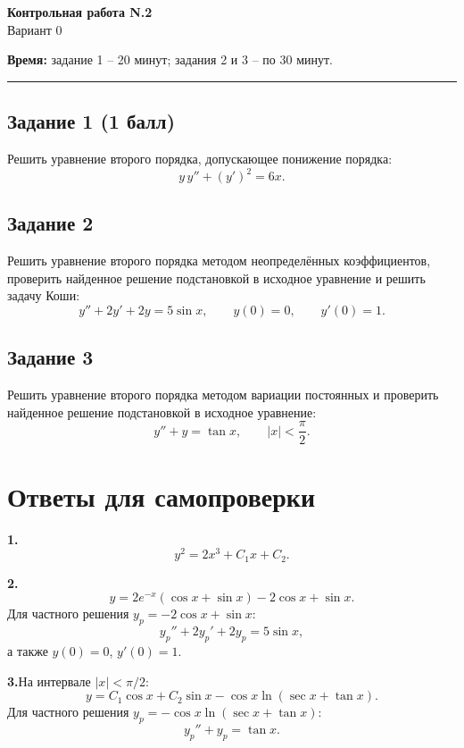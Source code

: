\documentclass[12pt,a4paper]{article}
\begin{document}
\begin{center}
{\Large \textbf{Контрольная работа N.2}}\\[4pt]
Вариант 0
\end{center}

\textbf{Время:} задание 1 -- 20 минут; задания 2 и 3 -- по 30 минут.

\hrule

\subsection*{Задание 1 (1 балл)}
Решить уравнение второго порядка, допускающее понижение порядка:
\[
y\,y''+(y')^2=6x.
\]

\subsection*{Задание 2}
Решить уравнение второго порядка методом неопределённых коэффициентов,
проверить найденное решение подстановкой в исходное уравнение и решить
задачу Коши:
\[
y''+2y'+2y=5\sin x, \qquad y(0)=0, \qquad y'(0)=1.
\]

\subsection*{Задание 3}
Решить уравнение второго порядка методом вариации постоянных и проверить
найденное решение подстановкой в исходное уравнение:
\[
y''+y=\tan x, \qquad |x|<\frac{\pi}{2}.
\]

\newpage
\section*{Ответы для самопроверки}

\textbf{1.}\quad
\[
y^2=2x^3+C_1x+C_2.
\]

\textbf{2.}\quad
\[
y=2e^{-x}(\cos x+\sin x)-2\cos x+\sin x.
\]
Для частного решения $y_p=-2\cos x+\sin x$:
\[
y_p''+2y_p'+2y_p=5\sin x,
\]
а также $y(0)=0$, $y'(0)=1$.

\textbf{3.}\quad На интервале $|x|<\pi/2$:
\[
y=C_1\cos x+C_2\sin x-\cos x\ln(\sec x+\tan x).
\]
Для частного решения $y_p=-\cos x\ln(\sec x+\tan x)$:
\[
y_p''+y_p=\tan x.
\]
\end{document}
